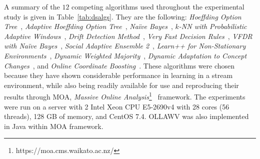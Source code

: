 \documentclass[reqno]{vcuthesis}
\numberwithin{equation}{chapter}
\begin{document}
 A summary of the $12$ competing algorithms used throughout the experimental study is given in Table~\ref{tab:dsalgs}. They are the following: \textit{Hoeffding Option Tree}~\cite{pfahringer2007new}, \textit{Adaptive Hoeffding Option Tree}~\cite{pfahringer2007new}, \textit{Na\"{i}ve Bayes}~\cite{john1995estimating}, \textit{$k$-NN with Probabilistic Adaptive Windows}~\cite{bifet2013efficient}, \textit{Drift Detection Method}~\cite{gama2004learning}, \textit{Very Fast Decision Rules}~\cite{gama2011learning}, \textit{VFDR with Na\"{i}ve Bayes}~\cite{gama2011learning}, \textit{Social Adaptive Ensemble 2}~\cite{gomes2014sae2}, \textit{Learn++ for Non-Stationary Environments}~\cite{elwell2011incremental}, \textit{Dynamic Weighted Majority}~\cite{kolter2007dynamic}, \textit{Dynamic Adaptation to Concept Changes}~\cite{jaber2013new}, and \textit{Online Coordinate Boosting}~\cite{pelossof2009online}. These algorithms were chosen because they have shown considerable performance in learning in a stream environment, while also being readily available for use and reproducing their results through MOA, \textit{Massive Online Analysis}\footnote{https://moa.cms.waikato.ac.nz/}~\cite{moacite} framework. The experiments were run on a server with 2 Intel Xeon CPU E5-2690v4 with 28 cores (56 threads), 128 GB of memory, and CentOS 7.4. OLLAWV was also implemented in Java within MOA framework. 
\end{document}

